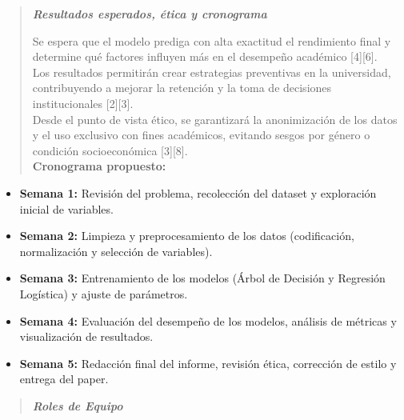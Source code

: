 \documentclass[
]{article}
\begin{document}
\begin{quote}
\emph{\textbf{Resultados esperados, ética y cronograma}}

Se espera que el modelo prediga con alta exactitud el rendimiento final
y determine qué factores influyen más en el desempeño académico
{[}4{]}{[}6{]}.\\
Los resultados permitirán crear estrategias preventivas en la
universidad, contribuyendo a mejorar la retención y la toma de
decisiones institucionales {[}2{]}{[}3{]}.\\
Desde el punto de vista ético, se garantizará la anonimización de los
datos y el uso exclusivo con fines académicos, evitando sesgos por
género o condición socioeconómica {[}3{]}{[}8{]}.\\
\textbf{Cronograma propuesto:}~
\end{quote}

\begin{itemize}
\item
  \textbf{Semana 1:} Revisión del problema, recolección del dataset y
  exploración inicial de variables.~
\end{itemize}

\begin{itemize}
\item
  \textbf{Semana 2:} Limpieza y preprocesamiento de los datos
  (codificación, normalización y selección de variables).~
\end{itemize}

\begin{itemize}
\item
  \textbf{Semana 3:} Entrenamiento de los modelos (Árbol de Decisión y
  Regresión Logística) y ajuste de parámetros.~
\end{itemize}

\begin{itemize}
\item
  \textbf{Semana 4:} Evaluación del desempeño de los modelos, análisis
  de métricas y visualización de resultados.~
\end{itemize}

\begin{itemize}
\item
  \textbf{Semana 5:} Redacción final del informe, revisión ética,
  corrección de estilo y entrega del paper.~
\end{itemize}

\begin{quote}
\emph{\textbf{Roles de Equipo}}
\end{quote}
\end{document}

